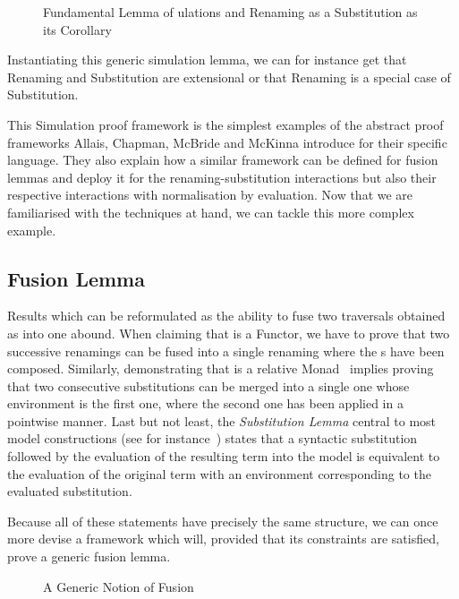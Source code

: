 \begin{figure}[h]
\caption{Fundamental Lemma of ulations and Renaming as a Substitution as its Corollary}
\end{figure}

Instantiating this generic simulation lemma, we can for instance get
that Renaming and Substitution are extensional or that Renaming is a
special case of Substitution.

This Simulation proof framework is the simplest examples of the abstract
proof frameworks Allais, Chapman, McBride and McKinna introduce for their
specific language. They also explain how a similar framework can be defined
for fusion lemmas and deploy it for the renaming-substitution interactions
but also their respective interactions with normalisation by evaluation.
Now that we are familiarised with the techniques at hand, we can tackle
this more complex example.



\subsection{Fusion Lemma}

Results which can be reformulated as the ability to fuse two traversals
obtained as  into one abound. When claiming that  is
a Functor, we have to prove that two successive renamings can be fused into
a single renaming where the s have been composed. Similarly,
demonstrating that  is a relative Monad~\cite{JFR4389} implies proving
that two consecutive substitutions can be merged into a single one whose
environment is the first one, where the second one has been applied in a
pointwise manner. Last but not least, the \emph{Substitution Lemma} central
to most model constructions (see for instance~\cite{mitchell1991kripke}) states
that a syntactic substitution followed by the evaluation of the resulting term
into the model is equivalent to the evaluation of the original term with an
environment corresponding to the evaluated substitution.

Because all of these statements have precisely the same structure, we can
once more devise a framework which will, provided that its constraints are
satisfied, prove a generic fusion lemma.

\begin{figure}[h]
\caption{A Generic Notion of Fusion}
\end{figure}

